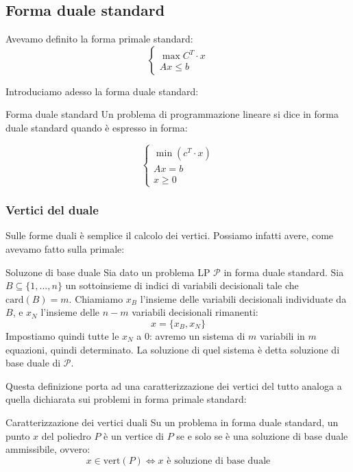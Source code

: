 \documentclass[a4paper,11pt]{article}
\begin{document}
\subsection{Forma duale standard}
Avevamo definito la forma primale standard:
\[
	\begin{cases}
		\max{C^T \cdot x} \\
		Ax \leq b
	\end{cases}
\]

Introduciamo adesso la forma duale standard:
\begin{definition}{Forma duale standard}
	Un problema di programmazione lineare si dice in forma duale standard quando è espresso in forma:
	
	\[
		\begin{cases}
			\min(c^T \cdot x) \\
			Ax = b \\
			x \geq 0
		\end{cases}
	\]

\end{definition}

\subsubsection{Vertici del duale}
Sulle forme duali è semplice il calcolo dei vertici. 
Possiamo infatti avere, come avevamo fatto sulla primale:
\begin{definition}{Soluzone di base duale}
	Sia dato un problema LP $\mathcal{P}$ in forma duale standard.
	Sia $B \subseteq \{ 1, ..., n \}$ un sottoinsieme di indici di variabili decisionali tale che $\mathrm{card}(B) = m$.
	Chiamiamo $x_B$ l'insieme delle variabili decisionali individuate da $B$, e $x_N$ l'insieme delle $n - m$ variabili decisionali rimanenti:
	$$ x = \{x_B, x_N\}$$
	Impostiamo quindi tutte le $x_N$ a 0: avremo un sistema di $m$ variabili in $m$ equazioni, quindi determinato.
	La soluzione di quel sistema è detta soluzione di base duale di $\mathcal{P}$.
\end{definition}

Questa definizione porta ad una caratterizzazione dei vertici del tutto analoga a quella dichiarata sui problemi in forma primale standard:

\begin{theorem}{Caratterizzazione dei vertici duali}
	Su un problema in forma duale standard, un punto $x$ del poliedro $P$ è un vertice di $P$ se e solo se è una soluzione di base duale ammissibile, ovvero:
	$$ 
	x \in \mathrm{vert}(P) \Leftrightarrow \text{$x$ è soluzione di base duale}
	$$
\end{theorem}
\end{document}

